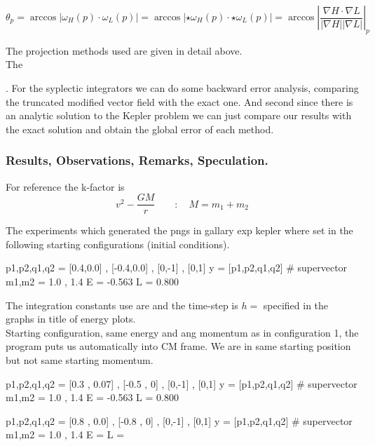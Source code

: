 \documentclass[12pt]{article}
\begin{document}
\begin{equation}\label{eq:angle between level sets}
    \theta_p = \arccos{|\omega_H(p) \cdot \omega_L(p)|} = \arccos|\star \omega_H(p) \cdot \star\omega_L(p)| = \arccos\left| \frac{\nabla H \cdot \nabla L }{|\nabla H| |\nabla L|} \right|_p
\end{equation}

The projection methods used are given in detail above.\\

The 

. For the syplectic integrators we can do some backward error analysis, comparing the truncated modified vector field with the exact one. And second since there is an analytic solution to the Kepler problem we can just compare our results with the exact solution and obtain the global error of each method. 

\subsubsection{Results, Observations, Remarks, Speculation.}



For reference the k-factor is 
\begin{equation}
    v^2 - \frac{G M}{r}\qquad:\quad M = m_1+m_2
\end{equation}

The experiments which generated the pngs in gallary exp kepler where set in the following starting configurations (initial conditions).
\begin{python}
p1,p2,q1,q2 = [0.4,0.0] , [-0.4,0.0] , [0,-1] , [0,1]
y = [p1,p2,q1,q2] # supervector
m1,m2 = 1.0 , 1.4
E = -0.563
L = 0.800
\end{python}
The integration constants use are  and the time-step is $h =$  specified in the graphs in title of energy plots.\\

Starting configuration, same energy and ang momentum as in configuration 1, the program puts us automatically into CM frame. We are in same starting position but not same starting momentum.
\begin{python}
p1,p2,q1,q2 = [0.3 , 0.07] , [-0.5 , 0] , [0,-1] , [0,1]
y = [p1,p2,q1,q2] # supervector
m1,m2 = 1.0 , 1.4
E = -0.563
L = 0.800
\end{python}

\begin{python}
p1,p2,q1,q2 = [0.8 , 0.0] , [-0.8 , 0] , [0,-1] , [0,1]
y = [p1,p2,q1,q2] # supervector
m1,m2 = 1.0 , 1.4
E = 
L = 
\end{python}
\end{document}
